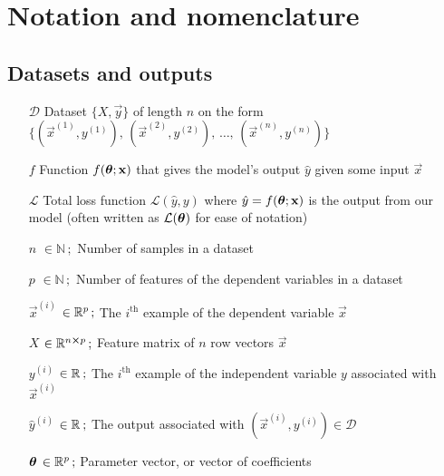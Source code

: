 


\tableofcontents
\section*{Notation and nomenclature}

\subsection*{Datasets and outputs} %
\begin{itemize}[leftmargin=2.4em]
    \item[$\mathcal{D}$] Dataset $\big\{ X, \vec{y} \big\}$ of length $n$ on the form $\big\{(\vec{x}^{(1)}, y^{(1)}),\,(\vec{x}^{(2)}, y^{(2)}),\,\dots, \, (\vec{x}^{(n)}, y^{(n)}) \big\} $
    \item[$f$] Function $f(\svec{\theta}; \vec{x})$ that gives the model's output $\hat{y}$ given some input $\vec{x}$
    \item[$\mathcal{L}$] Total loss function $\mathcal{L}(\hat{y}, y)$ where $\hat{y}= f(\svec{\theta}; \vec{x})$ is the output from our model (often written as $\mathcal{L}(\svec{\theta})$ for ease of notation)
    \item[$n$] $\in \mathbb{N}\,;$ Number of samples in a dataset
    \item[$p$] $\in \mathbb{N}\,;$ Number of features of the dependent variables in a dataset
    \item[$\vec{x}^{(i)}$] $\in\RR[p]\, ;$ The $i^\mathrm{th}$ example of the dependent variable $\vec{x}$
    \item[$X$] $\in\RR[n\cross p]\, ;$ Feature matrix of $n$ row vectors $\vec{x}$
    \item[$y^{(i)}$] $\in \RR\,;$ The $i^\mathrm{th}$ example of the independent variable $y$ associated with $\vec{x}^{(i)}$
    \item[$\hat{y}^{(i)}$] $\in \RR\,;$ The output associated with $(\vec{x}^{(i)}, y^{(i)}) \in \mathcal{D}$ 
    \item[$\svec{\theta}$] $\in\RR[p]\, ;$ Parameter vector, or vector of coefficients 
\end{itemize}
